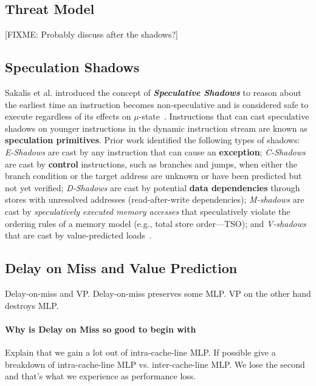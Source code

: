 \subsection{Threat Model}
\label{sec:threat}
{ \color{red} [FIXME: Probably discuss after the shadows?] }

\subsection{Speculation Shadows} 
Sakalis et al. introduced the concept of \textbf{\emph{Speculative Shadows}} to reason about the earliest time an instruction becomes non-speculative and is considered safe to execute regardless of its effects on $\mu$-state~\cite{sakalis2019efficient}.
Instructions that can cast speculative shadows on younger instructions in the dynamic instruction stream are known as \textbf{speculation primitives}.
Prior work identified the following types of shadows: \emph{E-Shadows} are cast by any instruction that can cause an \textbf{exception}; 
\emph{C-Shadows} are cast by \textbf{control} instructions, such as branches and jumps, when either the branch condition or the target address are unknown or have been predicted but not yet verified; \emph{D-Shadows} are cast by potential \textbf{data dependencies} through stores with unresolved addresses (read-after-write dependencies); \emph{M-shadows} are cast by \emph{speculatively executed memory accesses} that speculatively violate the ordering rules of a memory model (e.g., total store order---TSO); and \emph{V-shadows} that are cast by value-predicted loads~\cite{sakalis2019efficient}.

\subsection{Delay on Miss and Value Prediction}
\label{sec:dom-vp}
Delay-on-miss and VP. Delay-on-miss preserves some MLP. VP on the other hand destroys MLP.

\paragraph{Why is Delay on Miss so good to begin with}
Explain that we gain a lot out of intra-cache-line MLP.
If possible give a breakdown of intra-cache-line MLP vs. inter-cache-line MLP.
We lose the second and that's what we experience as performance loss.

